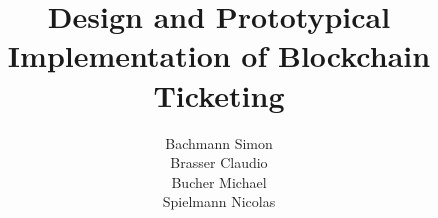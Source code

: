 \documentclass[12pt,a4paper,twoside]{book}
\begin{document}

\author{Bachmann Simon \\ Brasser Claudio \\ Bucher Michael \\ Spielmann Nicolas }
\title{Design and Prototypical Implementation of Blockchain Ticketing}
\submissiondate{\today}


\maketitle

\makeimprint





\tableofcontents

\cleardoublepage
{}


%

%
%










\listoffigures
{}
\listoftables


\end{document}
